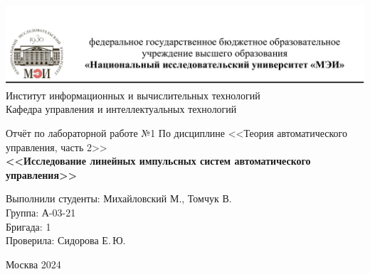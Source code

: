 \begin{titlepage}
	\newpage
	\begin{center}
		\includegraphics[width=\textwidth]{png/tit.png}
		Институт информационных и вычислительных технологий \\
			Кафедра управления и интеллектуальных технологий
		\vspace{1.25cm}
	\end{center}
	
	\vspace{1.2em}
	
	\begin{center}
		\begin{spacing}{1}
			{\Large Отчёт по лабораторной работе №1 \linebreak
			По дисциплине <<Теория автоматического управления, часть 2>> \\}
			\large{\bf<<Исследование линейных импульсных систем автоматического управления>>}
		\end{spacing}
	\end{center}
	
	\vspace{5em}
	

	\vspace{6em}
	
		\noindent Выполнили студенты: Михайловский М., Томчук В. \\
		Группа: А-03-21 \\
		Бригада: 1\\
		Проверила: Сидорова Е.\,Ю.
	
	
	\vspace{\fill}
	
	\begin{center}
		Москва 2024
	\end{center}
	
\end{titlepage}
